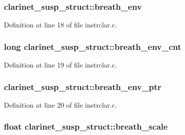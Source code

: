 \subsubsection[{\texorpdfstring{breath\+\_\+env}{breath_env}}]{ clarinet\+\_\+susp\+\_\+struct\+::breath\+\_\+env}\hypertarget{structclarinet__susp__struct_a2a7b7482b0801e24c4eefb516dfc13e3}{}\label{structclarinet__susp__struct_a2a7b7482b0801e24c4eefb516dfc13e3}


Definition at line 18 of file instrclar.\+c.

\subsubsection[{\texorpdfstring{breath\+\_\+env\+\_\+cnt}{breath_env_cnt}}]{\setlength{\rightskip}{0pt plus 5cm}long clarinet\+\_\+susp\+\_\+struct\+::breath\+\_\+env\+\_\+cnt}\hypertarget{structclarinet__susp__struct_a3c282cc51a24245e252d2d0084236d23}{}\label{structclarinet__susp__struct_a3c282cc51a24245e252d2d0084236d23}


Definition at line 19 of file instrclar.\+c.

\subsubsection[{\texorpdfstring{breath\+\_\+env\+\_\+ptr}{breath_env_ptr}}]{ clarinet\+\_\+susp\+\_\+struct\+::breath\+\_\+env\+\_\+ptr}\hypertarget{structclarinet__susp__struct_a414a7069e5dff0967d888793c49a9a0f}{}\label{structclarinet__susp__struct_a414a7069e5dff0967d888793c49a9a0f}


Definition at line 20 of file instrclar.\+c.

\subsubsection[{\texorpdfstring{breath\+\_\+scale}{breath_scale}}]{\setlength{\rightskip}{0pt plus 5cm}float clarinet\+\_\+susp\+\_\+struct\+::breath\+\_\+scale}\hypertarget{structclarinet__susp__struct_a431fd9f1de0f0b4bccca55d81be6d4a1}{}\label{structclarinet__susp__struct_a431fd9f1de0f0b4bccca55d81be6d4a1}


